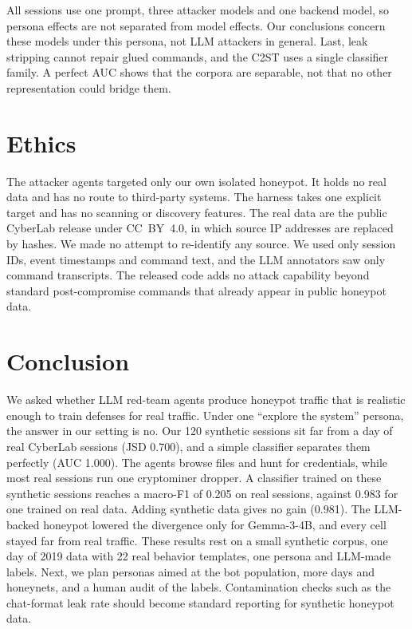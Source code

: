 \documentclass[conference]{IEEEtran}
\begin{document}
All sessions use one prompt, three attacker models and one backend model, so persona effects are not separated from model effects. Our conclusions concern these models under this persona, not LLM attackers in general. Last, leak stripping cannot repair glued commands, and the C2ST uses a single classifier family. A perfect AUC shows that the corpora are separable, not that no other representation could bridge them.

\section{Ethics}

The attacker agents targeted only our own isolated honeypot. It holds no real data and has no route to third-party systems. The harness takes one explicit target and has no scanning or discovery features. The real data are the public CyberLab release under CC~BY~4.0, in which source IP addresses are replaced by hashes. We made no attempt to re-identify any source. We used only session IDs, event timestamps and command text, and the LLM annotators saw only command transcripts. The released code adds no attack capability beyond standard post-compromise commands that already appear in public honeypot data.

\section{Conclusion}

We asked whether LLM red-team agents produce honeypot traffic that is realistic enough to train defenses for real traffic. Under one ``explore the system'' persona, the answer in our setting is no. Our 120 synthetic sessions sit far from a day of real CyberLab sessions (JSD 0.700), and a simple classifier separates them perfectly (AUC 1.000). The agents browse files and hunt for credentials, while most real sessions run one cryptominer dropper. A classifier trained on these synthetic sessions reaches a macro-F1 of 0.205 on real sessions, against 0.983 for one trained on real data. Adding synthetic data gives no gain (0.981). The LLM-backed honeypot lowered the divergence only for Gemma-3-4B, and every cell stayed far from real traffic. These results rest on a small synthetic corpus, one day of 2019 data with 22 real behavior templates, one persona and LLM-made labels. Next, we plan personas aimed at the bot population, more days and honeynets, and a human audit of the labels. Contamination checks such as the chat-format leak rate should become standard reporting for synthetic honeypot data.
\end{document}
